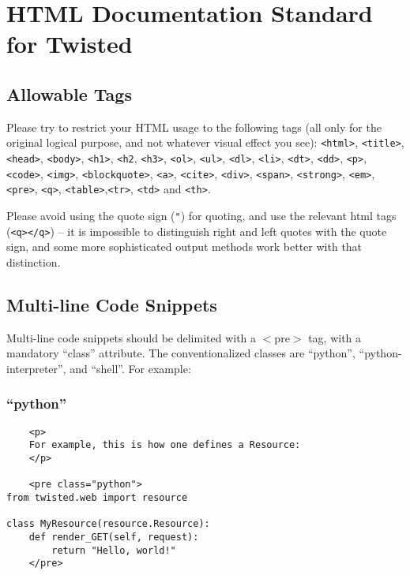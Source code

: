 \section{HTML Documentation Standard for Twisted\label{doc/howto/policy/doc-standard.xhtml}}


\subsection{Allowable Tags}


Please try to restrict your HTML usage to the following tags (all only for the original logical purpose, and not whatever visual effect you see): \texttt{<html>}, \texttt{<title>}, \texttt{<head>}, \texttt{<body>}, \texttt{<h1>}, \texttt{<h2}, \texttt{<h3>}, \texttt{<ol>}, \texttt{<ul>}, \texttt{<dl>}, \texttt{<li>},   \texttt{<dt>}, \texttt{<dd>}, \texttt{<p>}, \texttt{<code>},  \texttt{<img>},  \texttt{<blockquote>},  \texttt{<a>},  \texttt{<cite>}, \texttt{<div>}, \texttt{<span>}, \texttt{<strong>}, \texttt{<em>}, \texttt{<pre>}, \texttt{<q>}, \texttt{<table>},\texttt{<tr>}, \texttt{<td>} and \texttt{<th>}.

Please avoid using the quote sign (\texttt{"}) for quoting, and use the relevant html tags (\texttt{<q></q>}) -- it is impossible to distinguish right and left quotes with the quote sign, and some more sophisticated output methods work better with that distinction.

\subsection{Multi-line Code Snippets}


Multi-line code snippets should be delimited with a     $<$pre$>$ tag, with a mandatory ``class'' attribute. The     conventionalized classes are ``python'', ``python-interpreter'',     and ``shell''. For example:

\subsubsection{``python''}
\begin{verbatim}
    <p>
    For example, this is how one defines a Resource:
    </p>

    <pre class="python">
from twisted.web import resource

class MyResource(resource.Resource):
    def render_GET(self, request):
        return "Hello, world!"
    </pre>
\end{verbatim}


